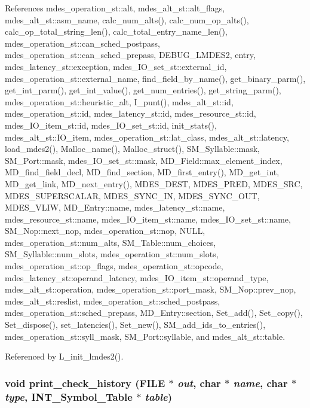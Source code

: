 References mdes\_\-operation\_\-st::alt, mdes\_\-alt\_\-st::alt\_\-flags, mdes\_\-alt\_\-st::asm\_\-name, calc\_\-num\_\-alts(), calc\_\-num\_\-op\_\-alts(), calc\_\-op\_\-total\_\-string\_\-len(), calc\_\-total\_\-entry\_\-name\_\-len(), mdes\_\-operation\_\-st::can\_\-sched\_\-postpass, mdes\_\-operation\_\-st::can\_\-sched\_\-prepass, DEBUG\_\-LMDES2, entry, mdes\_\-latency\_\-st::exception, mdes\_\-IO\_\-set\_\-st::external\_\-id, mdes\_\-operation\_\-st::external\_\-name, find\_\-field\_\-by\_\-name(), get\_\-binary\_\-parm(), get\_\-int\_\-parm(), get\_\-int\_\-value(), get\_\-num\_\-entries(), get\_\-string\_\-parm(), mdes\_\-operation\_\-st::heuristic\_\-alt, I\_\-punt(), mdes\_\-alt\_\-st::id, mdes\_\-operation\_\-st::id, mdes\_\-latency\_\-st::id, mdes\_\-resource\_\-st::id, mdes\_\-IO\_\-item\_\-st::id, mdes\_\-IO\_\-set\_\-st::id, init\_\-stats(), mdes\_\-alt\_\-st::IO\_\-item, mdes\_\-operation\_\-st::lat\_\-class, mdes\_\-alt\_\-st::latency, load\_\-mdes2(), Malloc\_\-name(), Malloc\_\-struct(), SM\_\-Syllable::mask, SM\_\-Port::mask, mdes\_\-IO\_\-set\_\-st::mask, MD\_\-Field::max\_\-element\_\-index, MD\_\-find\_\-field\_\-decl, MD\_\-find\_\-section, MD\_\-first\_\-entry(), MD\_\-get\_\-int, MD\_\-get\_\-link, MD\_\-next\_\-entry(), MDES\_\-DEST, MDES\_\-PRED, MDES\_\-SRC, MDES\_\-SUPERSCALAR, MDES\_\-SYNC\_\-IN, MDES\_\-SYNC\_\-OUT, MDES\_\-VLIW, MD\_\-Entry::name, mdes\_\-latency\_\-st::name, mdes\_\-resource\_\-st::name, mdes\_\-IO\_\-item\_\-st::name, mdes\_\-IO\_\-set\_\-st::name, SM\_\-Nop::next\_\-nop, mdes\_\-operation\_\-st::nop, NULL, mdes\_\-operation\_\-st::num\_\-alts, SM\_\-Table::num\_\-choices, SM\_\-Syllable::num\_\-slots, mdes\_\-operation\_\-st::num\_\-slots, mdes\_\-operation\_\-st::op\_\-flags, mdes\_\-operation\_\-st::opcode, mdes\_\-latency\_\-st::operand\_\-latency, mdes\_\-IO\_\-item\_\-st::operand\_\-type, mdes\_\-alt\_\-st::operation, mdes\_\-operation\_\-st::port\_\-mask, SM\_\-Nop::prev\_\-nop, mdes\_\-alt\_\-st::reslist, mdes\_\-operation\_\-st::sched\_\-postpass, mdes\_\-operation\_\-st::sched\_\-prepass, MD\_\-Entry::section, Set\_\-add(), Set\_\-copy(), Set\_\-dispose(), set\_\-latencies(), Set\_\-new(), SM\_\-add\_\-ids\_\-to\_\-entries(), mdes\_\-operation\_\-st::syll\_\-mask, SM\_\-Port::syllable, and mdes\_\-alt\_\-st::table.

Referenced by L\_\-init\_\-lmdes2().
\subsubsection{\setlength{\rightskip}{0pt plus 5cm}void print\_\-check\_\-history (FILE $\ast$ {\em out}, char $\ast$ {\em name}, char $\ast$ {\em type}, \bf{INT\_\-Symbol\_\-Table} $\ast$ {\em table})}\label{lmdes2_8c_03b8d53dbd6d6382363c8186cb91193a}




